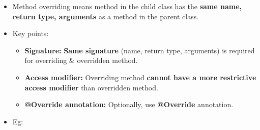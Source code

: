 \setlength{\columnsep}{3pt}
\begin{flushleft}
	
	\begin{itemize}
		\item Method overriding means method in the child class has the \textbf{same name, return type, arguments} as a method in the parent class.
		\item Key points:
		\begin{itemize}
			\item \textbf{Signature:} \textbf{Same signature} (name, return type, arguments) is required for overriding \& overridden method.
			\item \textbf{Access modifier:} Overriding method \textbf{cannot have a more restrictive access modifier} than overridden method.
			\item \textbf{@Override annotation:} Optionally, use \textbf{@Override} annotation.
		\end{itemize}
		\item Eg:
		\bigskip
	\end{itemize}
	
\end{flushleft}

\newpage
